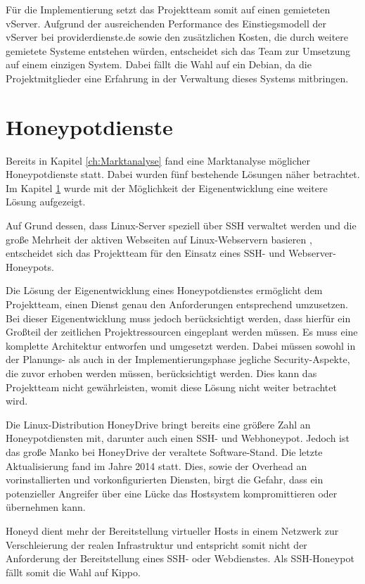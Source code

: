 Für die Implementierung setzt das Projektteam somit auf einen gemieteten vServer. Aufgrund der ausreichenden Performance des Einstiegsmodell der vServer bei providerdienste.de sowie den zusätzlichen Kosten, die durch weitere gemietete Systeme entstehen würden, entscheidet sich das Team zur Umsetzung auf einem einzigen System. Dabei fällt die Wahl auf ein Debian, da die Projektmitglieder eine Erfahrung in der Verwaltung dieses Systems mitbringen.\\

\section{Honeypotdienste}
\label{sec:Honeypotdienste}

Bereits in Kapitel \ref{ch:Marktanalyse} fand eine Marktanalyse möglicher Honeypotdienste statt. Dabei wurden fünf bestehende Lösungen näher betrachtet. Im Kapitel \ref{sec:Honeypotdienste} wurde mit der Möglichkeit der Eigenentwicklung eine weitere Lösung aufgezeigt.

Auf Grund dessen, dass Linux-Server speziell über SSH verwaltet werden und die große Mehrheit der aktiven Webseiten auf Linux-Webservern basieren \cite{w3techs16}, entscheidet sich das Projektteam für den Einsatz eines SSH- und Webserver-Honeypots.

Die Lösung der Eigenentwicklung eines Honeypotdienstes ermöglicht dem Projektteam, einen Dienst genau den Anforderungen entsprechend umzusetzen. Bei dieser Eigenentwicklung muss jedoch berücksichtigt werden, dass hierfür ein Großteil der zeitlichen Projektressourcen eingeplant werden müssen. Es muss eine komplette Architektur entworfen und umgesetzt werden. Dabei müssen sowohl in der Planungs- als auch in der Implementierungsphase jegliche Security-Aspekte, die zuvor erhoben werden müssen, berücksichtigt werden. Dies kann das Projektteam nicht gewährleisten, womit diese Lösung nicht weiter betrachtet wird.


Die Linux-Distribution HoneyDrive bringt bereits eine größere Zahl an Honeypotdiensten mit, darunter auch einen SSH- und Webhoneypot. Jedoch ist das große Manko bei HoneyDrive der veraltete Software-Stand. Die letzte Aktualisierung fand im Jahre 2014 statt. Dies, sowie der Overhead an vorinstallierten und vorkonfigurierten Diensten, birgt die Gefahr, dass ein potenzieller Angreifer über eine Lücke das Hostsystem kompromittieren oder übernehmen kann.

Honeyd dient mehr der Bereitstellung virtueller Hosts in einem Netzwerk zur Verschleierung der realen Infrastruktur und entspricht somit nicht der Anforderung der Bereitstellung eines SSH- oder Webdienstes. Als SSH-Honeypot fällt somit die Wahl auf Kippo.

